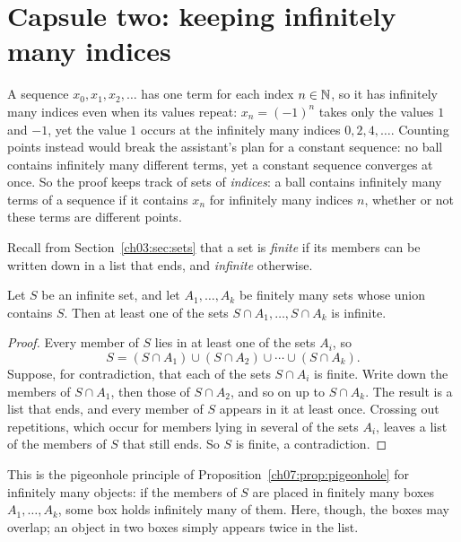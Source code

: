 \section{Capsule two: keeping infinitely many indices}\label{ch17:sec:pigeonhole}
A sequence $x_0,x_1,x_2,\ldots$ has one term for each index $n\in\mathbb N$, so it has infinitely many indices even when its values repeat: $x_n=(-1)^n$ takes only the values $1$ and $-1$, yet the value $1$ occurs at the infinitely many indices $0,2,4,\ldots$. Counting points instead would break the assistant's plan for a constant sequence: no ball contains infinitely many different terms, yet a constant sequence converges at once. So the proof keeps track of sets of \emph{indices}: a ball contains infinitely many terms of a sequence if it contains $x_n$ for infinitely many indices $n$, whether or not these terms are different points.

Recall from Section~\ref{ch03:sec:sets} that a set is \emph{finite} if its members can be written down in a list that ends, and \emph{infinite} otherwise.

\par\noindent\begin{minipage}{\linewidth}
\begin{lemma}\label{ch17:lem:pigeonhole}
Let $S$ be an infinite set, and let $A_1,\ldots,A_k$ be finitely many sets whose union contains $S$. Then at least one of the sets $S\cap A_1,\ldots,S\cap A_k$ is infinite.
\end{lemma}
\end{minipage}\par

\begin{proof}
Every member of $S$ lies in at least one of the sets $A_i$, so
\[
 S=(S\cap A_1)\cup(S\cap A_2)\cup\cdots\cup(S\cap A_k).
\]
Suppose, for contradiction, that each of the sets $S\cap A_i$ is finite. Write down the members of $S\cap A_1$, then those of $S\cap A_2$, and so on up to $S\cap A_k$. The result is a list that ends, and every member of $S$ appears in it at least once. Crossing out repetitions, which occur for members lying in several of the sets $A_i$, leaves a list of the members of $S$ that still ends. So $S$ is finite, a contradiction.
\end{proof}

This is the pigeonhole principle of Proposition~\ref{ch07:prop:pigeonhole} for infinitely many objects: if the members of $S$ are placed in finitely many boxes $A_1,\ldots,A_k$, some box holds infinitely many of them. Here, though, the boxes may overlap; an object in two boxes simply appears twice in the list.

